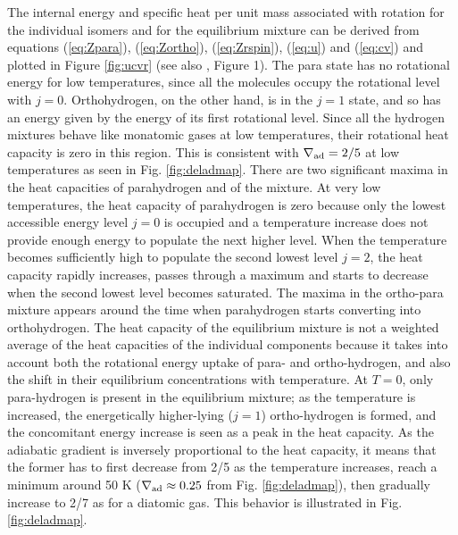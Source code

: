 \documentclass[apj]{emulateapj}
\newcommand{\delad}{\nabla_{\rm ad}}
\begin{document}
The internal energy and specific heat per unit mass associated with rotation for the individual isomers and for the equilibrium mixture can be derived from equations (\ref{eq:Zpara}), (\ref{eq:Zortho}), (\ref{eq:Zrspin}), (\ref{eq:u}) and (\ref{eq:cv}) and plotted in Figure \ref{fig:ucvr} (see also \citealt{farkas35}, Figure 1). The para state has no rotational energy for low temperatures, since all the molecules occupy the rotational level with $j=0$. Orthohydrogen, on the other hand, is in the $j=1$ state, and so has an energy given by the energy of its first rotational level. Since all the hydrogen mixtures behave like monatomic gases at low temperatures, their rotational heat capacity is zero in this region. This is consistent with $\delad=2/5$ at low temperatures as seen in Fig. \ref{fig:deladmap}. There are two significant maxima in the heat capacities of parahydrogen and of the mixture. At very low temperatures, the heat capacity of parahydrogen is zero because only the lowest accessible energy level $j=0$ is occupied and a temperature increase does not provide enough energy to populate the next higher level. When the temperature becomes sufficiently high to populate the second lowest level $j=2$, the heat capacity rapidly increases, passes through a maximum and starts to decrease when the second lowest level becomes saturated. The maxima in the ortho-para mixture appears around the time when parahydrogen starts converting into orthohydrogen. The heat capacity of the equilibrium mixture is not a weighted average of the heat capacities of the individual components because it takes into account both the rotational energy uptake of para- and ortho-hydrogen, and also the shift in their equilibrium concentrations with temperature. At $T=0$, only para-hydrogen is present in the equilibrium mixture; as the temperature is increased, the energetically higher-lying ($j=1$) ortho-hydrogen is formed, and the concomitant energy increase is seen as a peak in the heat capacity. As the adiabatic gradient is inversely proportional to the heat capacity, it means that  the former has to first decrease from 2/5 as the temperature increases, reach a minimum around 50 K ($\delad \approx 0.25$ from Fig. \ref{fig:deladmap}), then gradually increase to 2/7 as for a diatomic gas. This behavior is illustrated in Fig. \ref{fig:deladmap}.  
\end{document}

